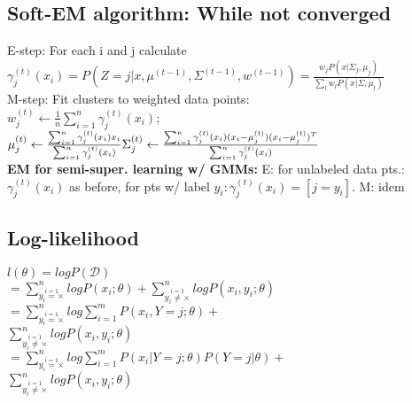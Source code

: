\subsection*{Soft-EM algorithm: While not converged}
E-step: For each i and j calculate $\gamma_j^{(t)}(x_i)= P(Z=j|x, \mu^{(t-1)}, \Sigma^{(t-1)}, w^{(t-1)}) = \frac{w_jP(x|\Sigma_j, \mu_j)}{\sum_l w_lP(x|\Sigma, \mu_l)}$\\
M-step: Fit clusters to weighted data points:\\

$w_j^{(t)} \leftarrow \frac{1}{n} \sum_{i=1}^n \gamma_j^{(t)} (x_i)$;  %
$\mu_j^{(t)} \leftarrow \frac{\sum_{i=1}^n \gamma_j^{(t)} (x_i) x_i}{\sum_{i=1}^n \gamma_j^{(t)} (x_i)}\\ %
\Sigma_j^{(t)} \leftarrow \frac{\sum_{i=1}^n \gamma_j^{(t)}(x_i) (x_i - \mu_j^{(t)}) (x_i - \mu_j^{(t)})^T}{\sum_{i=1}^n \gamma_j^{(t)}(x_i)}$\\ %
\textbf{EM for semi-super. learning w/ GMMs:}
E: for unlabeled data pts.: $\gamma_j^{(t)}(x_i)$ as before, for pts w/ label $y_i: \gamma_j^{(t)}(x_i) = [j = y_i]$. M: idem


\iffalse
\subsection*{Log-likelihood}
$l(\theta) = log P(\mathcal{D})$ \\
$=\sum_{\overset{i=1}{y_i=\times}}^n log P(x_i;\theta) + \sum_{\overset{i=1}{y_i\not=\times}}^n log P(x_i,y_i;\theta)$\\
$=\sum_{\overset{i=1}{y_i=\times}}^n log \sum_{i=1}^m P(x_i, Y=j;\theta) +$\\
$ \sum_{\overset{i=1}{y_i\not=\times}}^n log P(x_i,y_i;\theta)$\\
$=\sum_{\overset{i=1}{y_i=\times}}^n log \sum_{i=1}^m P(x_i|Y=j;\theta)P(Y=j|\theta) +$\\
$ \sum_{\overset{i=1}{y_i\not=\times}}^n log P(x_i,y_i;\theta)$

